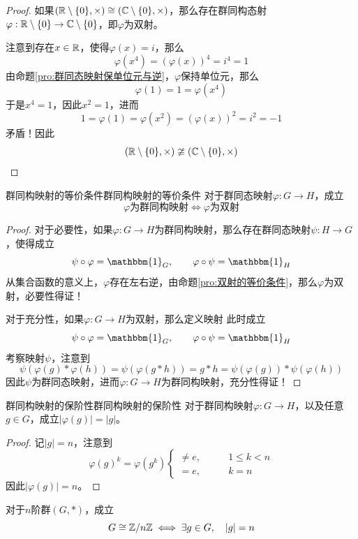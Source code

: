\begin{proof}
	如果$(\mathbb{R}\setminus\{0\},\times)\cong (\mathbb{C}\setminus\{0\},\times)$，那么存在群同构态射$\varphi:\mathbb{R}\setminus\{0\}\to\mathbb{C}\setminus\{0\}$，即$\varphi$为双射。
	
	注意到存在$x\in\mathbb{R}$，使得$\varphi(x)=i$，那么
	$$
	\varphi(x^4)=(\varphi(x))^4=i^4=1
	$$
	由命题\ref{pro:群同态映射保单位元与逆}，$\varphi$保持单位元，那么
	$$
	\varphi(1)=1=\varphi(x^4)
	$$
	于是$x^4=1$，因此$x^2=1$，进而
	$$
	1=\varphi(1)=\varphi(x^2)=(\varphi(x))^2=i^2=-1
	$$
	矛盾！因此
	\[ 
	(\mathbb{R}\setminus\{0\},\times)\ncong (\mathbb{C}\setminus\{0\},\times) 
	\]
\end{proof}

\begin{theorem}{群同构映射的等价条件}{群同构映射的等价条件}
	对于群同态映射$\varphi:G\to H$，成立
	$$
	\varphi\text{为群同构映射}\iff \varphi\text{为双射}
	$$
\end{theorem}

\begin{proof}
	对于必要性，如果$\varphi:G\to H$为群同构映射，那么存在群同态映射$\psi:H\to G$，使得成立
	$$
	\psi\circ \varphi=\mathbbm{1}_{G},\qquad
	\varphi\circ \psi=\mathbbm{1}_{H}
	$$
	从集合函数的意义上，$\varphi$存在左右逆，由命题\ref{pro:双射的等价条件}，那么$\varphi$为双射，必要性得证！
	
	对于充分性，如果$\varphi:G\to H$为双射，那么定义映射
	此时成立
	$$
	\psi\circ \varphi=\mathbbm{1}_{G},\qquad
	\varphi\circ \psi=\mathbbm{1}_{H}
	$$
	考察映射$\psi$，注意到
	$$
	\psi(\varphi(g)*\varphi(h))
	=\psi(\varphi(g*h))
	=g*h
	=\psi(\varphi(g))*\psi(\varphi(h))
	$$
	因此$\psi$为群同态映射，进而$\varphi:G\to H$为群同构映射，充分性得证！
\end{proof}

\begin{proposition}{群同构映射的保阶性}{群同构映射的保阶性}
	对于群同构映射$\varphi:G\to H$，以及任意$g\in G$，成立$|\varphi(g)|=|g|$。
\end{proposition}

\begin{proof}
	记$|g|=n$，注意到
	\[ 
	\varphi(g)^k=\varphi(g^k)\begin{cases}
		\ne e,\qquad & 1\le k<n\\
		=e,\qquad & k=n
	\end{cases}
	 \]
	 因此$|\varphi(g)|=n$。
\end{proof}

\begin{proposition}
	对于$n$阶群$(G,*)$，成立\[ G\cong \mathbb{Z}/n\mathbb{Z}\iff \exists g\in G,\quad |g|=n \]
\end{proposition}

